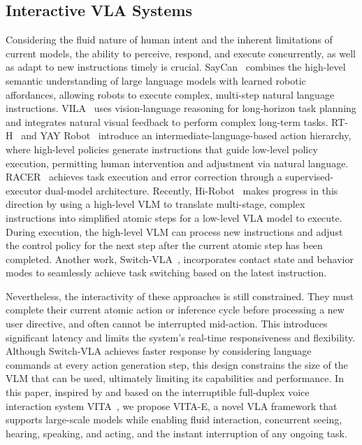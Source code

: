 \subsection{Interactive VLA Systems}
Considering the fluid nature of human intent and the inherent limitations of current models, the ability to perceive, respond, and execute concurrently, as well as adapt to new instructions timely is crucial. SayCan~\citep{saycan} combines the high-level semantic understanding of large language models with learned robotic affordances, allowing robots to execute complex, multi-step natural language instructions. VILA~\citep{vila} uses vision-language reasoning for long-horizon task planning and integrates natural visual feedback to perform complex long-term tasks. RT-H~\citep{rth} and YAY Robot~\citep{yay} introduce an intermediate-language-based action hierarchy, where high-level policies generate instructions that guide low-level policy execution, permitting human intervention and adjustment via natural language. RACER~\citep{dai2024racer} achieves task execution and error correction through a supervised-executor dual-model architecture. Recently, Hi-Robot~\citep{hirobot} makes progress in this direction by using a high-level VLM to translate multi-stage, complex instructions into simplified atomic steps for a low-level VLA model to execute. During execution, the high-level VLM can process new instructions and adjust the control policy for the next step after the current atomic step has been completed. Another work, Switch-VLA~\citep{switchvla}, incorporates contact state and behavior modes to seamlessly achieve task switching based on the latest instruction.

Nevertheless, the interactivity of these approaches is still constrained. They must complete their current atomic action or inference cycle before processing a new user directive, and often cannot be interrupted mid-action. This introduces significant latency and limits the system's real-time responsiveness and flexibility. Although Switch-VLA achieves faster response by considering language commands at every action generation step, this design constrains the size of the VLM that can be used, ultimately limiting its capabilities and performance. In this paper, inspired by and based on the interruptible full-duplex voice interaction system VITA~\citep{vita, vita15}, we propose VITA-E, a novel VLA framework that supports large-scale models while enabling fluid interaction, concurrent seeing, hearing, speaking, and acting, and the instant interruption of any ongoing task.
